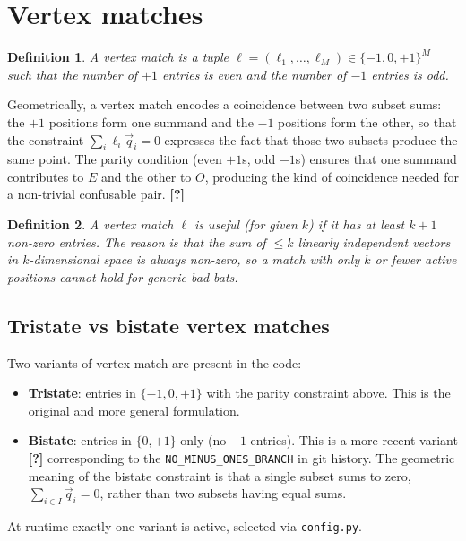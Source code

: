 \documentclass[12pt,a4paper]{article}
\newtheorem{definition}{Definition}
\begin{document}
\section{Vertex matches}
\label{sec:vertex-matches}

\begin{definition}
  A \emph{vertex match} is a tuple $\ell = (\ell_1, \ldots, \ell_M) \in
  \{-1, 0, +1\}^M$ such that the number of $+1$ entries is even and the number
  of $-1$ entries is odd.
\end{definition}

Geometrically, a vertex match encodes a coincidence between two subset sums:
the $+1$ positions form one summand and the $-1$ positions form the other, so
that the constraint $\sum_i \ell_i \vec{q}_i = 0$ expresses the fact that
those two subsets produce the same point. The parity condition (even $+1$s, odd
$-1$s) ensures that one summand contributes to $E$ and the other to $O$,
producing the kind of coincidence needed for a non-trivial confusable pair.
\textbf{[?]}

\begin{definition}
  A vertex match $\ell$ is \emph{useful} (for given $k$) if it has at least
  $k+1$ non-zero entries. The reason is that the sum of $\leq k$ linearly
  independent vectors in $k$-dimensional space is always non-zero, so a match
  with only $k$ or fewer active positions cannot hold for generic bad bats.
\end{definition}

\subsection*{Tristate vs bistate vertex matches}

Two variants of vertex match are present in the code:
\begin{itemize}
  \item \textbf{Tristate}: entries in $\{-1, 0, +1\}$ with the parity
    constraint above. This is the original and more general formulation.
  \item \textbf{Bistate}: entries in $\{0, +1\}$ only (no $-1$ entries). This
    is a more recent variant \textbf{[?]} corresponding to the
    \texttt{NO\_MINUS\_ONES\_BRANCH} in git history. The geometric meaning of
    the bistate constraint is that a single subset sums to zero, $\sum_{i \in
    I} \vec{q}_i = 0$, rather than two subsets having equal sums.
\end{itemize}
At runtime exactly one variant is active, selected via \texttt{config.py}.
\end{document}

